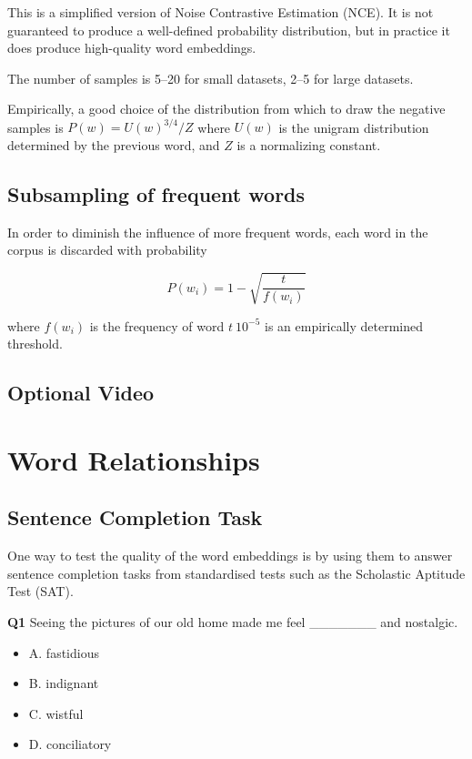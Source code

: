 \documentclass[11pt]{article}
\begin{document}
This is a simplified version of Noise Contrastive Estimation (NCE).
It is not guaranteed to produce a well-defined probability distribution, but in practice it does produce high-quality word embeddings.

The number of samples is 5--20 for small datasets, 2--5 for large datasets.

Empirically, a good choice of the distribution from which to draw the negative samples is $P(w) = U(w)^{3/4} / Z$ where $U(w)$ is the unigram distribution determined by the previous word, and $Z$ is a normalizing constant.

\subsection{Subsampling of frequent words}\label{subsec:subsampling-of-frequent-words}
In order to diminish the influence of more frequent words, each word in the corpus is discarded with probability

\[P(w_i) = 1 - \sqrt{\dfrac{t}{f(w_i)}}\]

where $f(w_i)$ is the frequency of word $t ~ 10^{-5}$ is an empirically determined threshold.

\subsection{Optional Video}\label{subsec:optional-video3}

\section{Word Relationships}\label{sec:word-relationships}
\subsection{Sentence Completion Task}\label{subsec:sentence-completion-task}

One way to test the quality of the word embeddings is by using them to answer sentence completion tasks from standardised tests such as the Scholastic Aptitude Test (SAT).

\textbf{Q1}
Seeing the pictures of our old home made me feel _______ and nostalgic.

\begin{itemize}
  \item A. fastidious
  \item B. indignant
  \item C. wistful
  \item D. conciliatory
\end{itemize}
\end{document}
